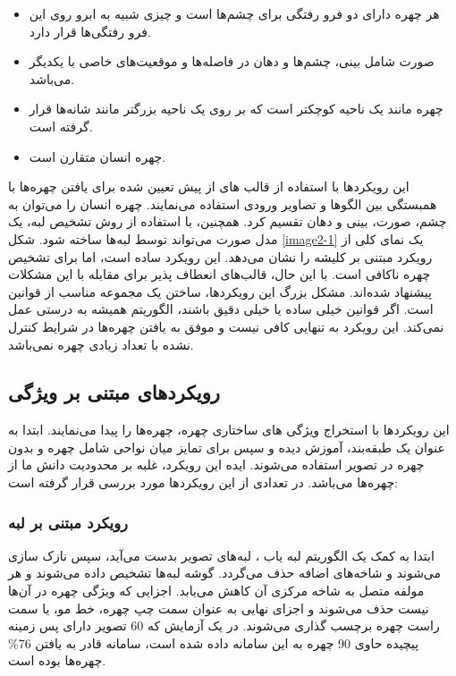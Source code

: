 \begin{itemize}
\item
هر چهره دارای دو فرو رفتگی برای چشم‌ها است و چیزی شبیه به ابرو روی این فرو رفتگی‌ها قرار دارد.
\item
صورت شامل بینی، چشم‌ها و دهان در فاصله‌ها و موقعیت‌های خاصی با یکدیگر می‌باشد.
\item
چهره مانند یک ناحیه کوچکتر است که بر روی یک ناحیه بزرگتر مانند شانه‌ها قرار گرفته است. 
\item
چهره انسان متقارن است.
\end{itemize} 

\noindent
این رویکردها با استفاده از قالب  ‌های از پیش تعیین شده برای یافتن چهره‌ها با همبستگی بین الگوها و تصاویر ورودی استفاده می‌نمایند. چهره انسان را می‌توان به چشم، صورت، بینی و دهان تقسیم کرد. همچنین، با استفاده از روش تشخیص لبه، یک مدل صورت می‌تواند توسط لبه‌ها ساخته شود. شکل \ref{image2-1} یک نمای کلی از رویکرد مبتنی بر کلیشه را نشان می‌دهد. این رویکرد ساده است، اما برای تشخیص چهره ناکافی است. با این حال، قالب‌های انعطاف پذیر برای مقابله با این مشکلات پیشنهاد شده‌اند. مشکل بزرگ این رویکرد‌ها، ساختن یک مجموعه مناسب از قوانین است. اگر قوانین خیلی ساده یا خیلی دقیق باشند، الگوریتم همیشه به درستی عمل نمی‌کند. این رویکرد به تنهایی کافی نیست و موفق به یافتن چهره‌ها در شرایط کنترل نشده با تعداد زیادی چهره نمی‌باشد.


\subsection{رویکردهای مبتنی بر ویژگی}
این رویکردها‌ با استخراج ویژگی  ‌های ساختاری چهره، چهره‌ها را پیدا می‌نمایند. ابتدا به عنوان یک طبقه‌بند، آموزش دیده و سپس برای تمایز میان نواحی شامل چهره و بدون چهره در تصویر استفاده می‌شوند. ایده این رویکرد، غلبه بر محدودیت دانش ما از چهره‌ها می‌باشد. در \cite{HJELMAS2001236} تعدادی از این رویکردها مورد بررسی قرار گرفته است:

\subsubsection{رویکرد مبتنی بر لبه}
ابتدا به کمک یک الگوریتم لبه یاب ، لبه‌های تصویر بدست می‌آید، سپس نازک سازی می‌شوند و شاخه‌های اضافه حذف می‌گردد. گوشه لبه‌ها تشخیص داده می‌شوند و هر مولفه متصل  به شاخه مرکزی آن کاهش می‌یابد. اجزایی که ویژگی چهره در آن‌ها نیست حذف می‌شوند و اجزای نهایی به عنوان سمت چپ چهره، خط مو، یا سمت راست چهره برچسب گذاری می‌شوند. در یک آزمایش که 60 تصویر دارای پس زمینه پیچیده حاوی 90 چهره به این سامانه داده شده است، سامانه قادر به یافتن 76\% چهره‌ها بوده است.


